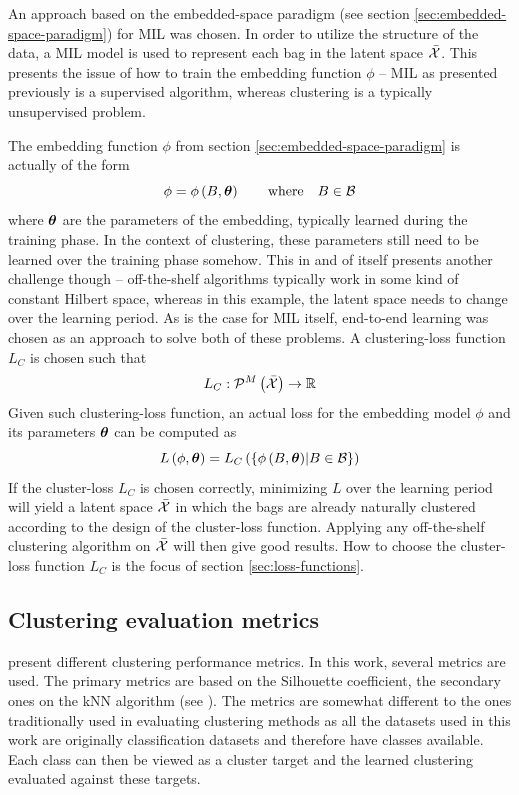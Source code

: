 An approach based on the embedded-space paradigm (see section \ref{sec:embedded-space-paradigm}) for MIL was chosen. In order to utilize the structure of the data, a MIL model is used to represent each bag in the latent space \( \bar{\mathcal{X}} \). This presents the issue of how to train the embedding function \( \phi \) -- MIL as presented previously is a supervised algorithm, whereas clustering is a typically unsupervised problem.

The embedding function \( \phi \) from section \ref{sec:embedded-space-paradigm} is actually of the form
\[ \phi = \phi \left( B, \bm{\theta} \right) \qquad \text{where} \quad B \in \mathcal{B} \]
where \( \bm{\theta} \) are the parameters of the embedding, typically learned during the training phase. In the context of clustering, these parameters still need to be learned over the training phase somehow. This in and of itself presents another challenge though -- off-the-shelf algorithms typically work in some kind of constant Hilbert space, whereas in this example, the latent space needs to change over the learning period. As is the case for MIL itself, end-to-end learning was chosen as an approach to solve both of these problems. A clustering-loss function \( L_C \) is chosen such that
\[ L_C: \mathcal{P}^M \left( \bar{\mathcal{X}} \right) \to \mathbb{R} \]
Given such clustering-loss function, an actual loss for the embedding model \( \phi \) and its parameters \( \bm{\theta} \) can be computed as
\[ L \left( \phi, \bm{\theta} \right) = L_C \left( \left\{ \phi \left( B, \bm{\theta} \right) \middle| B \in \mathcal{B} \right\} \right) \]
If the cluster-loss \( L_C \) is chosen correctly, minimizing \( L \) over the learning period will yield a latent space \( \bar{\mathcal{X}} \) in which the bags are already naturally clustered according to the design of the cluster-loss function. Applying any off-the-shelf clustering algorithm on \( \bar{\mathcal{X}} \) will then give good results. How to choose the cluster-loss function \( L_C \) is the focus of section \ref{sec:loss-functions}.

\subsection{Clustering evaluation metrics}\label{sec:clustering-metrics}

\cite{xu_comprehensive_2015} present different clustering performance metrics. In this work, several metrics are used. The primary metrics are based on the Silhouette coefficient, the secondary ones on the kNN algorithm (see \cite{dasarathy_nearest_1991}). The metrics are somewhat different to the ones traditionally used in evaluating clustering methods as all the datasets used in this work are originally classification datasets and therefore have classes available. Each class can then be viewed as a cluster target and the learned clustering evaluated against these targets.

